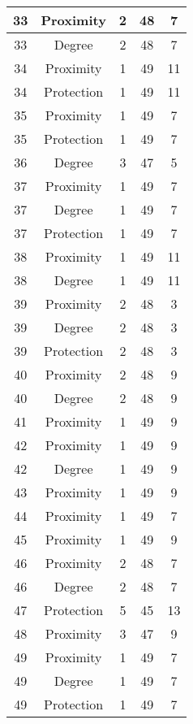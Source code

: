 \documentclass[results.tex]{subfiles}
\begin{document}
\begin{center}
\begin{tabular}{| c || c | c | c | c |}
    \hline
    33 & Proximity & 2 & 48 & 7 \\ 
    \hline
    33 & Degree & 2 & 48 & 7 \\ 
    \hline
    34 & Proximity & 1 & 49 & 11 \\ 
    \hline
    34 & Protection & 1 & 49 & 11 \\ 
    \hline
    35 & Proximity & 1 & 49 & 7 \\ 
    \hline
    35 & Protection & 1 & 49 & 7 \\ 
    \hline
    36 & Degree & 3 & 47 & 5 \\ 
    \hline
    37 & Proximity & 1 & 49 & 7 \\ 
    \hline
    37 & Degree & 1 & 49 & 7 \\ 
    \hline
    37 & Protection & 1 & 49 & 7 \\ 
    \hline
    38 & Proximity & 1 & 49 & 11 \\ 
    \hline
    38 & Degree & 1 & 49 & 11 \\ 
    \hline
    39 & Proximity & 2 & 48 & 3 \\ 
    \hline
    39 & Degree & 2 & 48 & 3 \\ 
    \hline
    39 & Protection & 2 & 48 & 3 \\ 
    \hline
    40 & Proximity & 2 & 48 & 9 \\ 
    \hline
    40 & Degree & 2 & 48 & 9 \\ 
    \hline
    41 & Proximity & 1 & 49 & 9 \\ 
    \hline
    42 & Proximity & 1 & 49 & 9 \\ 
    \hline
    42 & Degree & 1 & 49 & 9 \\ 
    \hline
    43 & Proximity & 1 & 49 & 9 \\ 
    \hline
    44 & Proximity & 1 & 49 & 7 \\ 
    \hline
    45 & Proximity & 1 & 49 & 9 \\ 
    \hline
    46 & Proximity & 2 & 48 & 7 \\ 
    \hline
    46 & Degree & 2 & 48 & 7 \\ 
    \hline
    47 & Protection & 5 & 45 & 13 \\ 
    \hline
    48 & Proximity & 3 & 47 & 9 \\ 
    \hline
    49 & Proximity & 1 & 49 & 7 \\ 
    \hline
    49 & Degree & 1 & 49 & 7 \\ 
    \hline
    49 & Protection & 1 & 49 & 7 \\ 
    \hline   \end{tabular}
\end{center}
\end{document}
